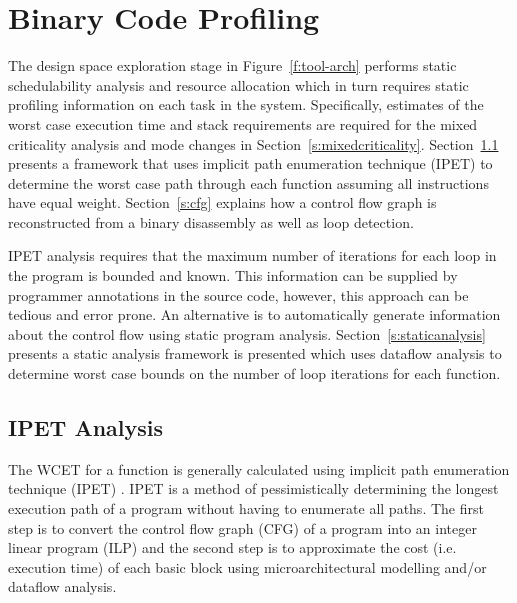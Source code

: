 
\chapter{Binary Code Profiling} %

\label{c:prof} %

	The design space exploration stage in Figure~\ref{f:tool-arch} performs static schedulability analysis and resource allocation which in turn requires static profiling information on each task in the system. 
	Specifically, estimates of the worst case execution time and stack requirements are required for the mixed criticality analysis and mode changes in Section~\ref{s:mixedcriticality}. 
	Section~\ref{s:ipet} presents a framework that uses implicit path enumeration technique (IPET) to determine the worst case path through each function assuming all instructions have equal weight. 
	Section~\ref{s:cfg} explains how a control flow graph is reconstructed from a binary disassembly as well as loop detection.
	
	IPET analysis requires that the maximum number of iterations for each loop in the program is bounded and known. 
	This information can be supplied by programmer annotations in the source code, however, this approach can be tedious and error prone. 
	An alternative is to automatically generate information about the control flow using static program analysis.
	Section~\ref{s:staticanalysis} presents a static analysis framework is presented which uses dataflow analysis to determine worst case bounds on the number of loop iterations for each function.

\section{IPET Analysis}
\label{s:ipet}
	The WCET for a function is generally calculated using implicit path enumeration technique (IPET) \cite{li1995performance}. 
	IPET is a method of pessimistically determining the longest execution path of a program without having to enumerate all paths. 
	The first step is to convert the control flow graph (CFG) of a program into an integer linear program (ILP) and the second step is to approximate the cost (i.e. execution time) of each basic block using microarchitectural modelling and/or dataflow analysis. 

